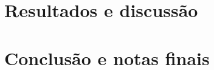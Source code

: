 \documentclass[10pt,a4paper,oneside]{article}
\begin{document}
\section{Resultados e discussão}
\label{sec:res}



\section{Conclusão e notas finais}
\label{sec:con}

%
%
\end{document}
